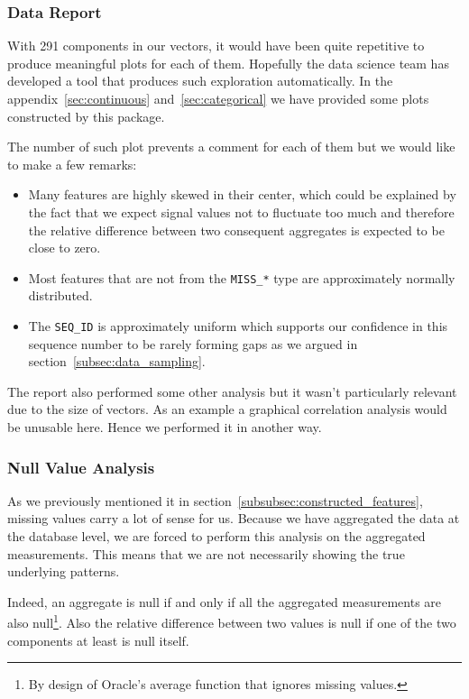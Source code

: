 \subsubsection{Data Report}
With 291 components in our vectors, it would have been quite repetitive to produce meaningful plots for each of them. Hopefully the data science team has developed a tool that produces such exploration automatically. In the appendix~\ref{sec:continuous} and~\ref{sec:categorical} we have provided some plots constructed by this package. 

The number of such plot prevents a comment for each of them but we would like to make a few remarks:
\begin{itemize}[noitemsep,topsep=0pt]
	\item Many features are highly skewed in their center, which could be explained by the fact that we expect signal values not to fluctuate too much and therefore the relative difference between two consequent aggregates is expected to be close to zero.
	\item Most features that are not from the \texttt{MISS\_*} type are approximately normally distributed. 
	\item The \texttt{SEQ\_ID} is approximately uniform which supports our confidence in this sequence number to be rarely forming gaps as we argued in section~\ref{subsec:data_sampling}.
\end{itemize}

The report also performed some other analysis but it wasn't particularly relevant due to the size of vectors. As an example a graphical correlation analysis would be unusable here. Hence we performed it in another way. 

\subsubsection{Null Value Analysis}
As we previously mentioned it in section~\ref{subsubsec:constructed_features}, missing values carry a lot of sense for us. Because we have aggregated the data at the database level, we are forced to perform this analysis on the aggregated measurements. This means that we are not necessarily showing the true underlying patterns. 

Indeed, an aggregate is null if and only if all the aggregated measurements are also null\footnote{By design of Oracle's average function that ignores missing values.}. Also the relative difference between two values is null if one of the two components at least is null itself. 

